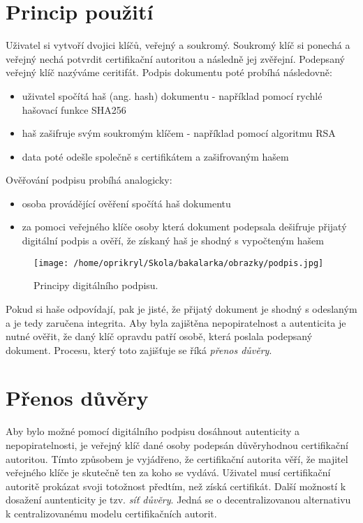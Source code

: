 \documentclass[]{fithesis3}
\begin{document}
\section{Princip použití}
Uživatel si vytvoří dvojici klíčů, veřejný a soukromý. Soukromý klíč si ponechá a veřejný nechá potvrdit certifikační autoritou a následně jej zvěřejní. Podepsaný veřejný klíč nazýváme ceritifát. Podpis dokumentu poté probíhá následovně:
\begin{itemize}
\item uživatel spočítá haš (ang. hash) dokumentu - například pomocí rychlé hašovací funkce SHA256
\item haš zašifruje svým soukromým klíčem - například pomocí algoritmu RSA
\item data poté odešle společně s certifikátem a zašifrovaným hašem
\end{itemize}
Ověřování podpisu probíhá analogicky:
\begin{itemize}
\item osoba provádějící ověření spočítá haš dokumentu
\item za pomoci veřejného klíče osoby která dokument podepsala dešifruje přijatý digitální podpis a ověří, že získaný haš je shodný s vypočteným hašem
\end{itemize}
\begin{figure}[!ht]
  	\begin{minipage}{1.00\textwidth}
    		\texttt{[image: /home/oprikryl/Skola/bakalarka/obrazky/podpis.jpg]}
  	\end{minipage}
 	\caption{Principy digitálního podpisu.}
  	\label{fig:Digitální podpis.}
\end{figure}
Pokud si haše odpovídají, pak je jisté, že přijatý dokument je shodný s odeslaným a je tedy zaručena integrita. Aby byla zajištěna nepopiratelnost a autenticita je nutné ověřit, že daný klíč opravdu patří osobě, která poslala podepsaný dokument. Procesu, který toto zajišťuje se říká \textit{přenos důvěry}.

\section{Přenos důvěry}
Aby bylo možné pomocí digitálního podpisu dosáhnout autenticity a nepopiratelnosti, je veřejný klíč dané osoby podepsán důvěryhodnou certifikační autoritou. Tímto způsobem je vyjádřeno, že certifikační autorita věří, že majitel veřejného klíče je skutečně ten za koho se vydává. Uživatel musí certifikační autoritě prokázat svoji totožnost předtím, než získá certifikát.
Další možností k dosažení auntenticity je tzv. \textit{síť důvěry}. Jedná se o decentralizovanou alternativu k centralizovanému modelu certifikačních autorit. 
\end{document}

